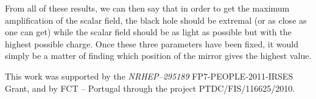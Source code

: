 \documentclass[aps, prd, twocolumn, amsmath, floats,floatfix, superscriptaddress,
nofootinbib, showpacs]{revtex4-1}
\begin{document}
From all of these results, we can then say that in order to get the maximum amplification of the scalar field,
the black hole should be extremal (or as close as one can get) while the scalar field should be as light as possible
but with the highest possible charge.
Once these three parameters have been fixed, it would simply be a matter of finding which position of the mirror 
gives the highest value.

  This work was supported by the {\it NRHEP--295189} FP7-PEOPLE-2011-IRSES Grant, and by
  FCT -- Portugal through the project PTDC/FIS/116625/2010.







\end{document}
